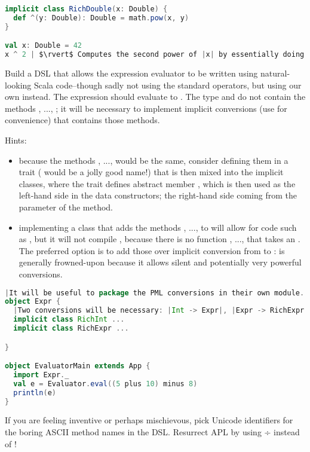 \documentclass[10 pt]{article}
\begin{document}
\begin{lstlisting}[caption={Pimp my library}, label={code:pml1}, language=Scala, escapechar=|]
implicit class RichDouble(x: Double) {
  def ^(y: Double): Double = math.pow(x, y)
}

val x: Double = 42
x ^ 2 | $\rvert$ Computes the second power of |x| by essentially doing |new RichDouble(x).^(2)|.|
\end{lstlisting}

\begin{example}
Build a DSL that allows the expression evaluator to be written using natural-looking Scala code--though sadly not using the standard \pcode{+, -, *, /} operators, but using our own  instead. The expression  should evaluate to . The type  and  do not contain the methods , ..., ; it will be necessary to implement implicit conversions (use  for convenience) that contains those methods. 

Hints: \begin{itemize}
  \item because the methods , ...,  would be the same, consider defining them in a trait ( would be a jolly good name!) that is then mixed into the implicit classes, where the trait defines abstract member , which is then used as the left-hand side in the  data constructors; the right-hand side coming from the parameter of the method.
  \item implementing a class that adds the methods , ...,  to  will allow for code such as , but it will not compile , because there is no function , ...,  that takes an . The preferred option is to add those over implicit conversion from  to :  is generally frowned-upon because it allows silent and potentially very powerful conversions.
\end{itemize}

\begin{lstlisting}[caption={Expression evaluator}, label={code:eepm}, language=Scala, escapechar=|]
|It will be useful to package the PML conversions in their own module.|
object Expr {
  |Two conversions will be necessary: |Int -> Expr|, |Expr -> RichExpr|.|
  implicit class RichInt ...
  implicit class RichExpr ...

}

object EvaluatorMain extends App {
  import Expr._
  val e = Evaluator.eval((5 plus 10) minus 8)
  println(e)
}
\end{lstlisting}

If you are feeling inventive or perhaps mischievous, pick Unicode identifiers for the boring ASCII method names in the DSL. Resurrect APL by using ÷ instead of !
\end{example}
\end{document}
